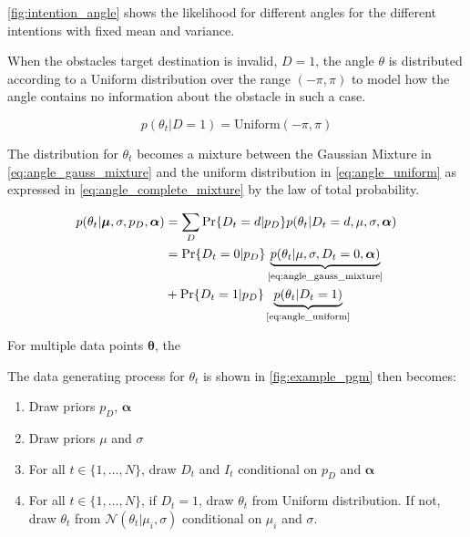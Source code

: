 \cref{fig:intention_angle} shows the likelihood for different angles for the different intentions with fixed mean and variance. 

When the obstacles target destination is invalid, $D=1$, the angle $\theta$ is distributed according to a Uniform distribution over the range $(-\pi, \pi)$ to model how the angle contains no information about the obstacle in such a case. 

\begin{equation}\label{eq:angle_uniform}
    p(\theta_t | D=1) = \text{Uniform}(-\pi, \pi)
\end{equation}

The distribution for $\theta_t$ becomes a mixture between the Gaussian Mixture in \cref{eq:angle_gauss_mixture} and the uniform distribution in  \cref{eq:angle_uniform} as expressed in \cref{eq:angle_complete_mixture} by the law of total probability.

\begin{align}\label{eq:angle_complete_mixture}
\begin{split}
     p(\theta_t | \boldsymbol{\mu}, \sigma, p_D, \boldsymbol{\alpha})
     &= \sum_D \Pr\{D_t=d | p_D\} p(\theta_t | D_t=d, \mu, \sigma, \boldsymbol{\alpha})\\
     &= \Pr\{D_t = 0 | p_D\} \underbrace{p(\theta_t | \mu, \sigma, D_t=0, \boldsymbol{\alpha})}_{\text{\cref{eq:angle_gauss_mixture}}}\\
     &+ \Pr\{D_t=1 | p_D\}\underbrace{p(\theta_t | D_t=1)}_{\text{\cref{eq:angle_uniform}}}
\end{split}
\end{align}

For multiple data points $\boldsymbol{\theta}$, the


The data generating process for $\theta_t$ is shown in \cref{fig:example_pgm} then becomes:

\begin{enumerate}
    \item Draw priors $p_D$, $\boldsymbol{\alpha}$ 
    \item Draw priors $\mu$ and $\sigma$
    \item For all $t \in \{1, \dots, N \}$, draw $D_t$ and $I_t$ conditional on $p_D$ and $\boldsymbol{\alpha}$
    \item For all $t \in \{1, \dots, N\} $, if $D_t=1$, draw $\theta_t$ from Uniform distribution. If not, draw $\theta_t$ from $\mathcal{N}(\theta_t | \mu_i, \sigma)$ conditional on $\mu_i$ and $\sigma$. 
\end{enumerate}

